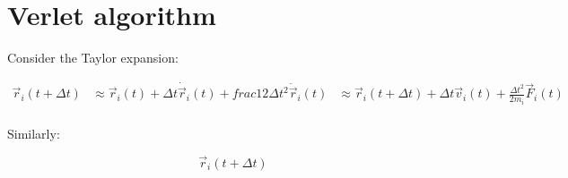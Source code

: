 \section{Verlet algorithm}
Consider the Taylor expansion:

\begin{align*}
	\vec{r}_i(t+\Delta t)&\approx \vec{r}_i(t) + \Delta t\dot{\vec{r}}_i(t) + frac{1}{2}\Delta t^2\ddot{\vec{r}}_i(t)
											 &\approx\vec{r}_i(t+\Delta t)+\Delta t\vec{v}_i(t)+\frac{\Delta t^2}{2m_i}\vec{F}_i(t) \\
\end{align*}

Similarly:

$$\vec{r}_i(t+\Delta t)$$
